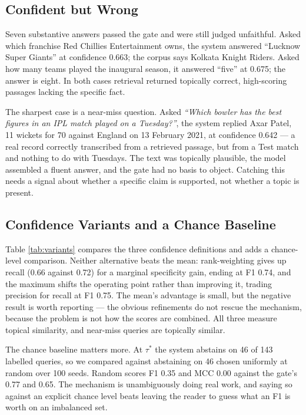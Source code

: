 \documentclass[conference]{IEEEtran}
\begin{document}
\subsection{Confident but Wrong}
\label{sec:failures}

Seven substantive answers passed the gate and were still judged unfaithful. Asked which franchise Red Chillies Entertainment owns, the system answered ``Lucknow Super Giants'' at confidence 0.663; the corpus says Kolkata Knight Riders. Asked how many teams played the inaugural season, it answered ``five'' at 0.675; the answer is eight. In both cases retrieval returned topically correct, high-scoring passages lacking the specific fact.

The sharpest case is a near-miss question. Asked \emph{``Which bowler has the best figures in an IPL match played on a Tuesday?''}, the system replied Axar Patel, 11 wickets for 70 against England on 13 February 2021, at confidence 0.642 --- a real record correctly transcribed from a retrieved passage, but from a Test match and nothing to do with Tuesdays. The text was topically plausible, the model assembled a fluent answer, and the gate had no basis to object. Catching this needs a signal about whether a specific claim is supported, not whether a topic is present.

\subsection{Confidence Variants and a Chance Baseline}

Table \ref{tab:variants} compares the three confidence definitions and adds a chance-level comparison. Neither alternative beats the mean: rank-weighting gives up recall (0.66 against 0.72) for a marginal specificity gain, ending at F1 0.74, and the maximum shifts the operating point rather than improving it, trading precision for recall at F1 0.75. The mean's advantage is small, but the negative result is worth reporting --- the obvious refinements do not rescue the mechanism, because the problem is not how the scores are combined. All three measure topical similarity, and near-miss queries are topically similar.

The chance baseline matters more. At $\tau^\ast$ the system abstains on 46 of 143 labelled queries, so we compared against abstaining on 46 chosen uniformly at random over 100 seeds. Random scores F1 0.35 and MCC 0.00 against the gate's 0.77 and 0.65. The mechanism is unambiguously doing real work, and saying so against an explicit chance level beats leaving the reader to guess what an F1 is worth on an imbalanced set.
\end{document}
